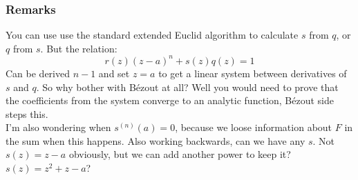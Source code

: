 \subsubsection{Remarks}
You can use use the standard extended Euclid algorithm to calculate $s$ from $q$, or $q$ from $s$.
But the relation:
\[r(z)(z-a)^n+s(z)q(z)=1\]
Can be derived $n-1$ and set $z=a$ to get a linear system between derivatives of $s$ and $q$.
So why bother with Bézout at all?
Well you would need to prove that the coefficients from the system converge to an analytic function,
Bézout side steps this.
\\

I'm also wondering when $s^{(n)}(a)=0$, because we loose information about $F$ in the sum when this happens.
Also working backwards, can we have any $s$.
Not $s(z) = z-a$ obviously, but we can add another power to keep it? 
$s(z) = z^2+z-a$?

